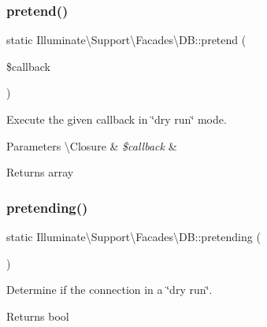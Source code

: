 \subsubsection{\texorpdfstring{pretend()}{pretend()}}
{\footnotesize\ttfamily static Illuminate\textbackslash{}\+Support\textbackslash{}\+Facades\textbackslash{}\+D\+B\+::pretend (\begin{DoxyParamCaption}\item[{}]{\$callback }\end{DoxyParamCaption})\hspace{0.3cm}{\ttfamily [static]}}

Execute the given callback in \char`\"{}dry run\char`\"{} mode.


\begin{DoxyParams}[1]{Parameters}
\textbackslash{}\+Closure & {\em \$callback} & \\
\hline
\end{DoxyParams}
\begin{DoxyReturn}{Returns}
array 
\end{DoxyReturn}
\mbox{\label{class_illuminate_1_1_support_1_1_facades_1_1_d_b_a5f51e88132ce508656b20d03b8cdd237}} 
\subsubsection{\texorpdfstring{pretending()}{pretending()}}
{\footnotesize\ttfamily static Illuminate\textbackslash{}\+Support\textbackslash{}\+Facades\textbackslash{}\+D\+B\+::pretending (\begin{DoxyParamCaption}{ }\end{DoxyParamCaption})\hspace{0.3cm}{\ttfamily [static]}}

Determine if the connection in a \char`\"{}dry run\char`\"{}.

\begin{DoxyReturn}{Returns}
bool 
\end{DoxyReturn}
\mbox{\label{class_illuminate_1_1_support_1_1_facades_1_1_d_b_ad182e19d6511300709463429b3161e46}} 

